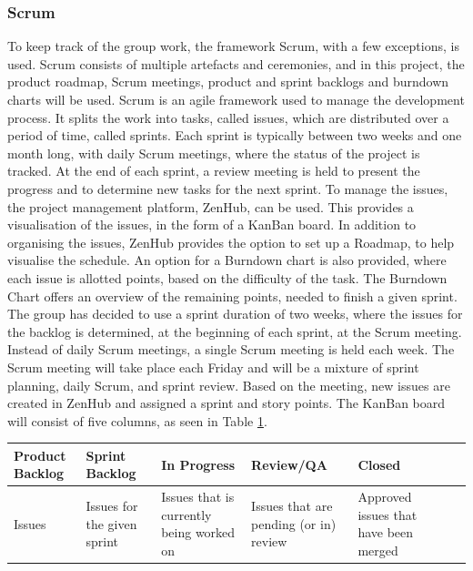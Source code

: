 \subsubsection{Scrum}
To keep track of the group work, the framework Scrum, with a few exceptions, is
used. Scrum consists of multiple artefacts and ceremonies, and in this project,
the product roadmap, Scrum meetings, product and sprint backlogs and burndown
charts will be used.
Scrum is an agile framework used to manage the development process. It splits
the work into tasks, called issues, which are distributed over a period of time,
called sprints. Each sprint is typically between two weeks and one month long,
with daily Scrum meetings, where the status of the project is tracked. At the
end of each sprint, a review meeting is held to present the progress and to
determine new tasks for the next sprint.
To manage the issues, the project management platform, ZenHub, can be used. This
provides a visualisation of the issues, in the form of a KanBan board. In
addition to organising the issues, ZenHub provides the option to set up a
Roadmap, to help visualise the schedule. An option for a Burndown chart is also
provided, where each issue is allotted points, based on the difficulty of the
task. The Burndown Chart offers an overview of the remaining points, needed to
finish a given sprint. \cite{scrum} \\

The group has decided to use a sprint duration of two weeks, where the issues
for the backlog is determined, at the beginning of each sprint, at the Scrum
meeting. Instead of daily Scrum meetings, a single Scrum meeting is held each
week. The Scrum meeting will take place each Friday and will be a mixture of
sprint planning, daily Scrum, and sprint review. Based on the meeting, new
issues are created in ZenHub and assigned a sprint and story points. The KanBan
board will consist of five columns, as seen in Table \ref{table:scrum}.

\begin{table}[H]
    \begin{tabularx}{\textwidth}{|>{\RaggedRight}X|>{\RaggedRight}X|>{\RaggedRight}X|>{\RaggedRight}X|>{\RaggedRight}X|>{\RaggedRight}X|>{\RaggedRight}X|}
        \hline                             
        \textbf{Product Backlog} & \textbf{Sprint Backlog} & \textbf{In Progress} & \textbf{Review/QA} & \textbf{Closed} \\
        \hline
        Issues & Issues for the given sprint & Issues that is currently being worked on & Issues that are pending (or in) review & Approved issues that have been merged    \\
        \hline
    \end{tabularx}
    \label{table:scrum}
\end{table} 

